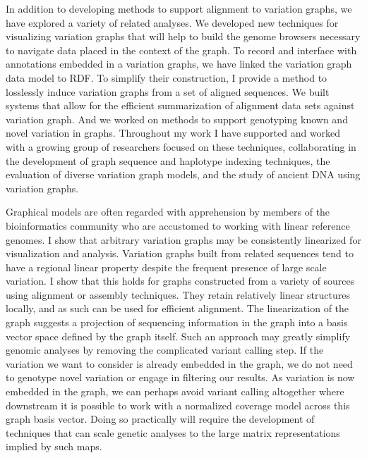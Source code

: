 In addition to developing methods to support alignment to variation graphs, we have explored a variety of related analyses.
We developed new techniques for visualizing variation graphs that will help to build the genome browsers necessary to navigate data placed in the context of the graph.
To record and interface with annotations embedded in a variation graphs, we have linked the variation graph data model to RDF.
To simplify their construction, I provide a method to losslessly induce variation graphs from a set of aligned sequences.
We built systems that allow for the efficient summarization of alignment data sets against variation graph.
And we worked on methods to support genotyping known and novel variation in graphs.
Throughout my work I have supported and worked with a growing group of researchers focused on these techniques, collaborating in the development of graph sequence and haplotype indexing techniques, the evaluation of diverse variation graph models, and the study of ancient DNA using variation graphs.

Graphical models are often regarded with apprehension by members of the bioinformatics community who are accustomed to working with linear reference genomes.
I show that arbitrary variation graphs may be consistently linearized for visualization and analysis.
Variation graphs built from related sequences tend to have a regional linear property despite the frequent presence of large scale variation.
I show that this holds for graphs constructed from a variety of sources using alignment or assembly techniques.
They retain relatively linear structures locally, and as such can be used for efficient alignment.
The linearization of the graph suggests a projection of sequencing information in the graph into a basis vector space defined by the graph itself.
Such an approach may greatly simplify genomic analyses by removing the complicated variant calling step.
If the variation we want to consider is already embedded in the graph, we do not need to genotype novel variation or engage in filtering our results.
As variation is now embedded in the graph, we can perhaps avoid variant calling altogether where downstream it is possible to work with a normalized coverage model across this graph basis vector.
Doing so practically will require the development of techniques that can scale genetic analyses to the large matrix representations implied by such maps.


